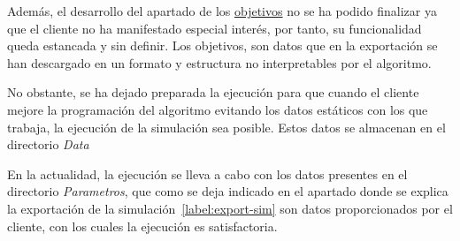 Además, el desarrollo del apartado de los \href{https://www.proyectoubu.nesiweb.com/objectives/home}{objetivos} no se ha podido finalizar ya que el cliente no ha manifestado especial interés, por tanto, su funcionalidad queda estancada y sin definir. Los objetivos, son datos que en la exportación se han descargado en un formato y estructura no interpretables por el algoritmo.

No obstante, se ha dejado preparada la ejecución para que cuando el cliente mejore la programación del algoritmo evitando los datos estáticos con los que trabaja, la ejecución de la simulación sea posible. Estos datos se almacenan en el directorio \textit{Data}

En la actualidad, la ejecución se lleva a cabo con los datos presentes en el directorio \textit{Parametros}, que como se deja indicado en el apartado donde se explica la exportación de la simulación~\ref{label:export-sim} son datos proporcionados por el cliente, con los cuales la ejecución es satisfactoria.

\newpage


 